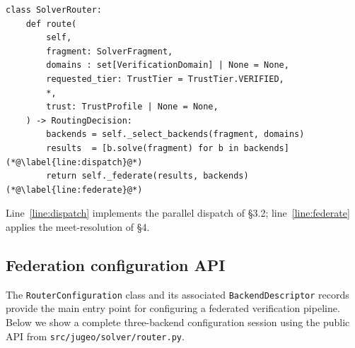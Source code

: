 \documentclass[11pt]{article}
\begin{document}
\begin{lstlisting}[style=jugeo-python, caption={%
  \texttt{SolverRouter.route} (condensed from
  \texttt{src/jugeo/solver/router.py}).}]
class SolverRouter:
    def route(
        self,
        fragment: SolverFragment,
        domains : set[VerificationDomain] | None = None,
        requested_tier: TrustTier = TrustTier.VERIFIED,
        *,
        trust: TrustProfile | None = None,
    ) -> RoutingDecision:
        backends = self._select_backends(fragment, domains)
        results  = [b.solve(fragment) for b in backends]  (*@\label{line:dispatch}@*)
        return self._federate(results, backends)           (*@\label{line:federate}@*)
\end{lstlisting}

Line~\ref{line:dispatch} implements the parallel dispatch of
§3.2; line~\ref{line:federate} applies the meet-resolution of §4.

\subsection{Federation configuration API}\label{sec:fed-api}

The \texttt{RouterConfiguration} class and its associated
\texttt{BackendDescriptor} records provide the main entry point for
configuring a federated verification pipeline.  Below we show a complete
three-backend configuration session using the public API from
\texttt{src/jugeo/solver/router.py}.
\end{document}

